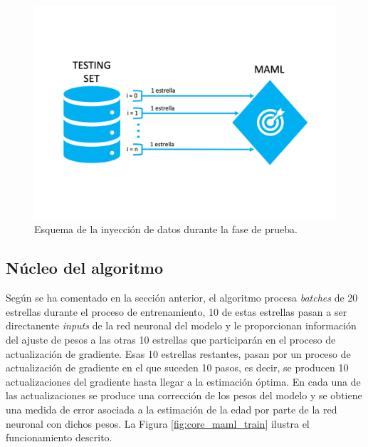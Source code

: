 \begin{figure}[H]
\begin{center}
 \includegraphics[width=0.8\linewidth]{Figuras/MAML/test_data.pdf}
\end{center}
\caption{Esquema de la inyección de datos durante la fase de prueba.}
 \label{fig:input_data_test}
\end{figure}


\subsection{Núcleo del algoritmo} 

Según se ha comentado en la sección anterior, el algoritmo procesa \emph{batches} de 20 estrellas durante el proceso de entrenamiento, 10 de estas estrellas pasan a ser directanente \emph{inputs} de la red neuronal del modelo y le proporcionan información del ajuste de pesos a las otras 10 estrellas que participarán en el proceso de actualización de gradiente. Esas 10 estrellas restantes, pasan por un proceso de actualización de gradiente en el que suceden 10 pasos, es decir, se producen 10 actualizaciones del gradiente hasta llegar a la estimación óptima. En cada una de las actualizaciones se produce una corrección de los pesos del modelo y se obtiene una medida de error asociada a la estimación de la edad por parte de la red neuronal con dichos pesos. La Figura \ref{fig:core_maml_train} ilustra el funcionamiento descrito.

